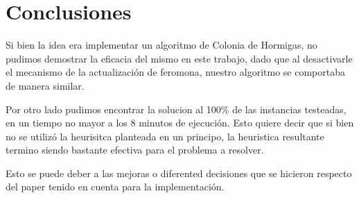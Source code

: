 \section{Conclusiones}
\label{sec:intro}

Si bien la idea era implementar un algoritmo de Colonia de Hormigas, no pudimos 
demostrar la eficacia del mismo en este trabajo, dado que al desactivarle el 
mecanismo de la actualización de feromona, nuestro algoritmo se comportaba de 
manera similar. 


Por otro lado pudimos encontrar la solucion al 100\% de las instancias testeadas, en un tiempo no mayor a los 
8 minutos de ejecución. Esto quiere decir que si bien no se utilizó la heurisitca planteada en un principo, la heuristica 
resultante termino siendo bastante efectiva para el problema a resolver.   

Esto se puede deber a las mejoras o diferented decisiones que se hicieron respecto del paper 
tenido en cuenta para la implementación.


\newpage
